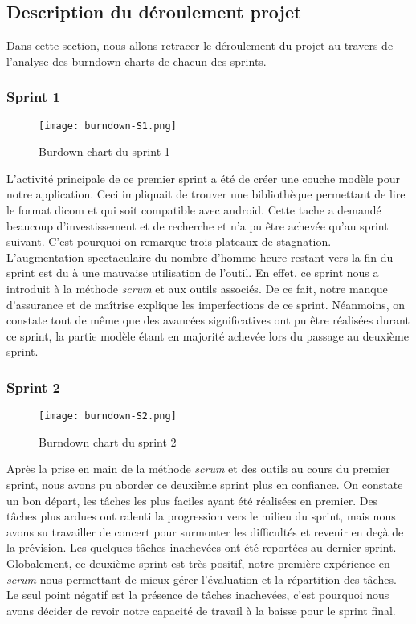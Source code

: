 \subsection{Description du déroulement projet}

Dans cette section, nous allons retracer le déroulement du projet au travers de l'analyse des burndown charts de chacun des sprints.

\subsubsection{Sprint 1}

\begin{figure}[h]
\begin{center}
	\texttt{[image: burndown-S1.png]}
\end{center}
	\caption{Burdown chart du sprint 1}
\end{figure}

L'activité principale de ce premier sprint a été de créer une couche modèle pour notre application. Ceci impliquait de trouver une bibliothèque permettant de lire le format dicom et qui soit compatible avec android. Cette tache a demandé beaucoup d'investissement et de recherche et n'a pu être achevée qu'au sprint suivant. C'est pourquoi on remarque trois plateaux de stagnation. L'augmentation spectaculaire du nombre d'homme-heure restant vers la fin du sprint est du à une mauvaise utilisation de l'outil. En effet, ce sprint nous a introduit à la méthode \emph{scrum} et aux outils associés. De ce fait, notre manque d'assurance et de maîtrise explique les imperfections de ce sprint. Néanmoins, on constate tout de même que des avancées significatives ont pu être réalisées durant ce sprint, la partie modèle étant en majorité achevée lors du passage au deuxième sprint.

\subsubsection{Sprint 2}

\begin{figure}[h]
\begin{center}
	\texttt{[image: burndown-S2.png]}
\end{center}
	\caption{Burndown chart du sprint 2}
\end{figure}

Après la prise en main de la méthode \emph{scrum} et des outils au cours du premier sprint, nous avons pu aborder ce deuxième sprint plus en confiance. On constate un bon départ, les tâches les plus faciles ayant été réalisées en premier. Des tâches plus ardues ont ralenti la progression vers le milieu du sprint, mais nous avons su travailler de concert pour surmonter les difficultés et revenir en deçà de la prévision. Les quelques tâches inachevées ont été reportées au dernier sprint. Globalement, ce deuxième sprint est très positif, notre première expérience en \emph{scrum} nous permettant de mieux gérer l'évaluation et la répartition des tâches. Le seul point négatif est la présence de tâches inachevées, c'est pourquoi nous avons décider de revoir notre capacité de travail à la baisse pour le sprint final.

